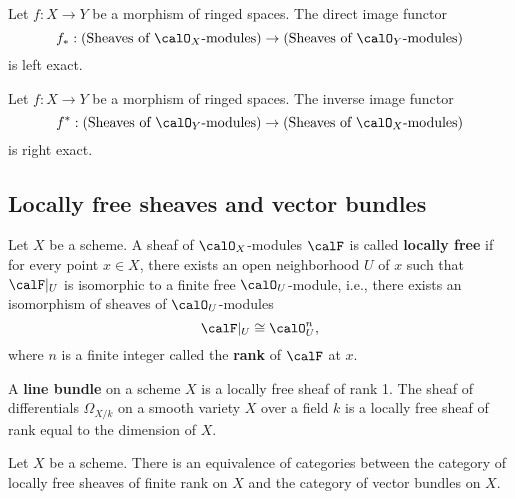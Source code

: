     \begin{theorem}\label{thm:direct_image_functor}
        Let $f:X\to Y$ be a morphism of ringed spaces. The direct image functor
        \[
            f_*: \text{(Sheaves of $\calO_X$-modules)} \to \text{(Sheaves of $\calO_Y$-modules)}
        \]
        is left exact.
    \end{theorem}

    \begin{theorem}\label{thm:inverse_image_functor}
        Let $f:X\to Y$ be a morphism of ringed spaces. The inverse image functor
        \[
            f^*: \text{(Sheaves of $\calO_Y$-modules)} \to \text{(Sheaves of $\calO_X$-modules)}
        \]
        is right exact.
    \end{theorem}

\subsection{Locally free sheaves and vector bundles}

    \begin{definition}\label{def:locally_free_sheaf}
        Let $X$ be a scheme. A sheaf of $\calO_X$-modules $\calF$ is called \textbf{locally free} if for every point $x\in X$, there exists an open neighborhood $U$ of $x$ such that $\calF|_U$ is isomorphic to a finite free $\calO_U$-module, i.e., there exists an isomorphism of sheaves of $\calO_U$-modules
        \[
            \calF|_U \cong \calO_U^n,
        \]
        where $n$ is a finite integer called the \textbf{rank} of $\calF$ at $x$.
    \end{definition}

    \begin{example}\label{eg:line_bundle}
        A \textbf{line bundle} on a scheme $X$ is a locally free sheaf of rank 1. The sheaf of differentials $\Omega_{X/k}$ on a smooth variety $X$ over a field $k$ is a locally free sheaf of rank equal to the dimension of $X$.
    \end{example}

    \begin{theorem}\label{thm:locally_free_sheaf_is_vector_bundle}
        Let $X$ be a scheme. There is an equivalence of categories between the category of locally free sheaves of finite rank on $X$ and the category of vector bundles on $X$.
    \end{theorem}

